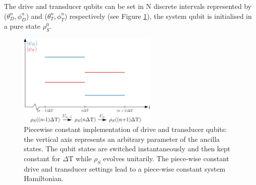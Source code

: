 The drive and transducer qubits can be set in N discrete intervals represented by ($\theta_D^n, \phi_D^n$) and ($\theta_T^n, \phi_T^n$) respectively (see Figure \ref{pwc}), the system qubit is initialised in a pure state $\rho_S^0$.

\begin{figure}[h]
	\centering
	\includegraphics[width=0.6\textwidth]{img/pwc2}
	\caption{Piecewise constant implementation of drive and transducer qubits: the vertical axis represents an arbitrary parameter of the ancilla states. The qubit states are switched instantaneously and then kept constant for $\Delta \mathrm{T}$ while $\rho_S$ evolves unitarily. The piece-wise constant drive and transducer settings lead to a piece-wise constant system Hamiltonian.}
	\label{pwc}
\end{figure}

